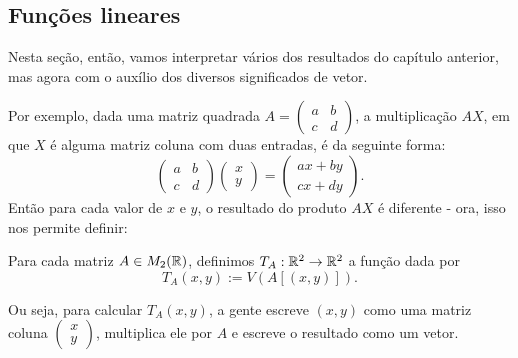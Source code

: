 \subsection{Funções lineares}

Nesta seção, então, vamos interpretar vários dos resultados do capítulo anterior, mas agora com o auxílio dos diversos significados de vetor.

Por exemplo, dada uma matriz quadrada $A=\begin{pmatrix}
a&b\\c&d
\end{pmatrix}$, a multiplicação $AX$, em que $X$ é alguma matriz coluna com duas entradas, é da seguinte forma:
\[\begin{pmatrix}
a&b\\c&d
\end{pmatrix}\begin{pmatrix}
x\\y
\end{pmatrix}=\begin{pmatrix}
ax+by\\cx+dy
\end{pmatrix}.\] Então para cada valor de $x$ e $y$, o resultado do produto $AX$ é diferente -  ora, isso nos permite definir:

\begin{df}
	Para cada matriz $A\in M_2(\mathbb R)$, definimos $T_A:\mathbb R^2\to \mathbb R^2$ a função dada por
	\[T_A(x,y):=V(A[(x,y)]).\]
\end{df}

Ou seja, para calcular $T_A(x,y)$, a gente escreve $(x,y)$ como uma matriz coluna $\begin{pmatrix}
x\\y
\end{pmatrix}$, multiplica ele por $A$ e escreve o resultado como um vetor.


